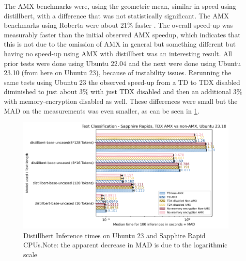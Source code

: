 The AMX benchmarks were, using the geometric mean, similar in speed using distillbert, with a difference that was not statistically significant. The AMX benchmarks using Roberta were about 21\% faster . The overall speed-up was measurably faster than the initial observed AMX speedup, which indicates that this is not due to the omission of AMX in general but something different but having no speed-up using AMX with distillbert was an interesting result. 
All prior tests were done using Ubuntu 22.04 and the next were done using Ubuntu 23.10 (from here on Ubuntu 23), because of instability issues. Rerunning the same tests using Ubuntu 23 the observed speed-up from a TD to TDX disabled diminished to just about 3\% with just TDX disabled and then an additional 3\% with memory-encryption disabled as well. These differences were small but the MAD on the measurements was even smaller, as can be seen in  \cref{fig:distillbertAMXUbuntu23}. 
\begin{figure}
   \centering
       \includegraphics[width=.95\textwidth]{figures/inferencedistillberMADUbuntu23AMX.png} 
 \caption{Distillbert Inference times on Ubuntu 23 and Sapphire Rapid CPUs.Note: the apparent decrease in MAD is due to the logarithmic scale}
 \label{fig:distillbertAMXUbuntu23}
\end{figure}

